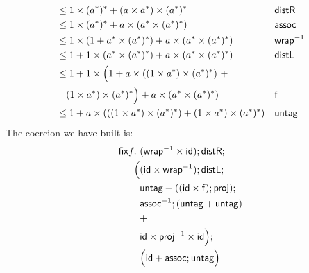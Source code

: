 \begin{example}
\begin{align}
                     &\leq 1 \times ({a^*})^* + (a \times a^* ) \times ({a^*})^* &&\mathsf{distR}\\
                     &\leq 1 \times ({a^*})^* +  a \times (a^*  \times ({a^*})^*) && \mathsf{assoc} \\
                     &\leq 1 \times (1 + a^* \times ({a^*})^*) +  a \times (a^*  \times ({a^*})^*)&& \mathsf{wrap}^{-1} \\
                     &\leq 1 + 1 \times (a^* \times ({a^*})^*) +  a \times (a^*  \times ({a^*})^*)&&\mathsf{distL}\\
                     &\leq 1 + 1\times \Big( 1 + a \times ((1 \times a^*) \times ({a^*})^*)~+\\
                     &\quad(1 \times a^*) \times ({a^*})^*\Big)  + a \times (a^*  \times ({a^*})^*) && \mathsf{f} \\
                     &\leq 1 + a \times (((1 \times a^*) \times ({a^*})^*) + (1 \times a^*) \times ({a^*})^*) && \mathsf{untag}
\end{align}
The coercion we have built is:
\begin{align}
\mathsf{fix} f.~&(\mathsf{wrap}^{-1} \times \mathsf{id});\mathsf{distR};\\
 \Big( &(\mathsf{id} \times \mathsf{wrap}^{-1});\mathsf{distL};\\
       &\mathsf{untag} + ((\mathsf{id} \times \mathsf{f});\mathsf{proj});\\
       &\mathsf{assoc}^{-1};(\mathsf{untag} + \mathsf{untag}) \\
&+\\
 &\mathsf{id} \times \mathsf{proj}^{-1} \times \mathsf{id} \Big);\\
 & \Big(\mathsf{id} + \mathsf{assoc} ; \mathsf{untag} \Big)
\end{align}

\end{example}
